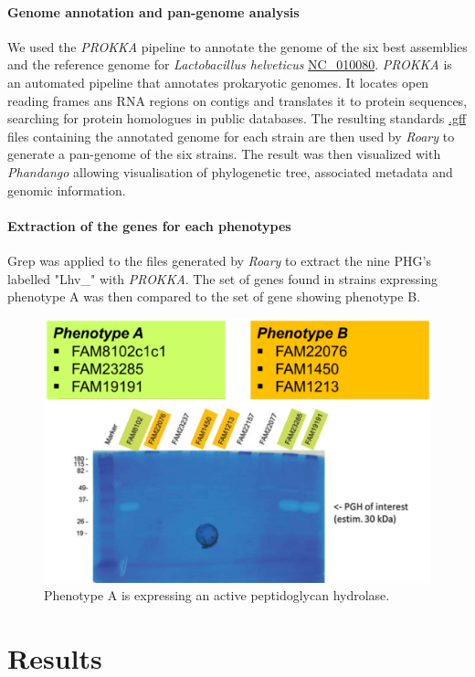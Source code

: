 \documentclass[10pt,a4paper]{report}
\begin{document}
\paragraph{Genome annotation and pan-genome analysis}
We used the \textit{PROKKA} pipeline\cite{seemann_prokka:_2014} to annotate the genome of the six best assemblies and the reference genome for \textit{Lactobacillus helveticus} \href{https://www.ncbi.nlm.nih.gov/genome/?term=NC_010080}{NC\_010080}. \textit{PROKKA} is an automated pipeline that annotates prokaryotic genomes. It locates open reading frames ans RNA regions on contigs and translates it to protein sequences, searching for protein homologues in public databases. The resulting standards \href{https://www.ensembl.org/info/website/upload/gff.html}{.gff} files containing the annotated genome for each strain are then used by \textit{Roary}\cite{page_roary:_2015} to generate a pan-genome of the six strains. The result was then visualized with \textit{Phandango}\cite{hadfield_phandango:_2018} allowing visualisation of phylogenetic tree, associated metadata and genomic information.

\paragraph{Extraction of the genes for each phenotypes} Grep was applied to the files generated by \textit{Roary} to extract the nine PHG's \cite{jebava_nine_2011} labelled "Lhv\_" with \textit{PROKKA}. The set of genes found in strains expressing phenotype A was then compared to the set of gene showing phenotype B. 

\begin{figure}
	\centering
	\includegraphics[width=0.7\linewidth]{img/zymography}
	\caption[The two phenotypes expressed by the six strains]{Phenotype A is expressing an active peptidoglycan hydrolase.}
	\label{fig:zymography}
\end{figure}

\section*{Results}


{}

\end{document}
